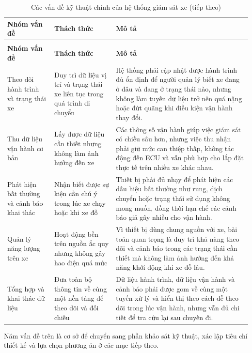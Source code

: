 \documentclass[a4paper]{extarticle}
\newcommand{\thesissettableid}[2]{%
  \renewcommand{\thetable}{#1}%
  \renewcommand{\theHtable}{#2}%
}
\begin{document}
{\thesissettableid{2.1}{condensed-r2-bang-2-1-cac-van-de-ky-thuat-chinh-cua-he-thong-giam-sat-xe}
\def\LTcaptype{table}
\begin{longtable}{|L{(\linewidth - 4\tabcolsep) * }|L{(\linewidth - 4\tabcolsep) * }|L{(\linewidth - 4\tabcolsep) * }|}
\caption{Các vấn đề kỹ thuật chính của hệ thống giám sát xe}\label{tab:condensed-r2-bang-2-1-cac-van-de-ky-thuat-chinh-cua-he-thong-giam-sat-xe}\\
\hline
\textbf{Nhóm vấn đề} & \textbf{Thách thức} & \textbf{Mô tả} \\
\hline
\endfirsthead
\caption[]{Các vấn đề kỹ thuật chính của hệ thống giám sát xe (tiếp theo)}\\
\hline
\textbf{Nhóm vấn đề} & \textbf{Thách thức} & \textbf{Mô tả} \\
\hline
\endhead
\endfoot
\endlastfoot
Theo dõi hành trình và trạng thái xe & Duy trì dữ liệu vị trí và trạng thái xe liên tục trong quá trình di chuyển & Hệ thống phải cập nhật được hành trình đủ ổn định để người quản lý biết xe đang ở đâu và đang ở trạng thái nào, nhưng không làm tuyến dữ liệu trở nên quá nặng hoặc đứt quãng khi điều kiện vận hành thay đổi. \\\hline
Thu dữ liệu vận hành cơ bản & Lấy được dữ liệu cần thiết nhưng không làm ảnh hưởng đến xe & Các thông số vận hành giúp việc giám sát có chiều sâu hơn, nhưng việc thu nhận phải giữ mức can thiệp thấp, không tác động đến ECU và vẫn phù hợp cho lắp đặt thực tế trên nhiều xe khác nhau. \\\hline
Phát hiện bất thường và cảnh báo khai thác & Nhận biết được sự kiện cần chú ý trong lúc xe chạy hoặc khi xe đỗ & Thiết bị phải đủ nhạy để phát hiện các dấu hiệu bất thường như rung, dịch chuyển hoặc trạng thái sử dụng không mong muốn, đồng thời hạn chế các cảnh báo giả gây nhiễu cho vận hành. \\\hline
Quản lý năng lượng trên xe & Hoạt động bền trên nguồn ắc quy nhưng không gây hao điện quá mức & Vì thiết bị dùng chung nguồn với xe, bài toán quan trọng là duy trì khả năng theo dõi và cảnh báo trong các trạng thái cần thiết mà không làm ảnh hưởng đến khả năng khởi động khi xe đỗ lâu. \\\hline
Tổng hợp và khai thác dữ liệu & Đưa toàn bộ thông tin về cùng một nền tảng để theo dõi và đối chiếu & Dữ liệu hành trình, dữ liệu vận hành và cảnh báo phải được gom về cùng một tuyến xử lý và hiển thị theo cách dễ theo dõi trong lúc vận hành, nhưng vẫn đủ chi tiết để tra cứu lại sau chuyến đi. \\\hline
\end{longtable}
}
Năm vấn đề trên là cơ sở để chuyển sang phần khảo sát kỹ thuật, xác lập tiêu chí thiết kế và lựa chọn phương án ở các mục tiếp theo.
\end{document}
